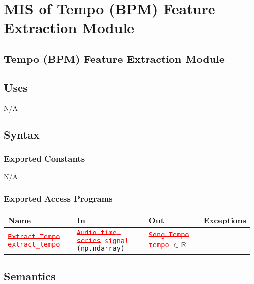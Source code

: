 \documentclass[12pt, titlepage]{article}
\begin{document}
\section{MIS of Tempo (BPM) Feature Extraction Module} 

\subsection{Tempo (BPM) Feature Extraction Module}

\subsection{Uses}
N/A

\subsection{Syntax}

\subsubsection{Exported Constants}
N/A

\subsubsection{Exported Access Programs}

\begin{center}
\begin{tabular}{p{4cm} p{4cm} p{4cm} p{2cm}}
\hline
\textbf{Name} & \textbf{In} & \textbf{Out} & \textbf{Exceptions}\\
\hline%
\texttt{\textcolor{red}{\st{Extract Tempo}}} \newline \texttt{\textcolor{red}{extract\_tempo}} &\texttt{\textcolor{red}{\st{Audio time series}} \newline \texttt{\textcolor{red}{signal}} (np.ndarray)} &\texttt{\textcolor{red}{\st{Song\_Tempo}} \newline \texttt{\textcolor{red}{tempo}}} $\in \mathbb{R}$ &- \\
\hline
\end{tabular}
\end{center}

\subsection{Semantics}
\end{document}
